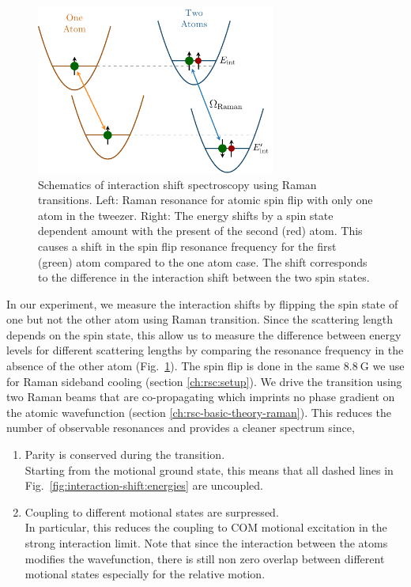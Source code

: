 \begin{figure}
  \centering
  \includegraphics[width=0.7\textwidth]{figures/interaction_shift_measure.pdf}
  \caption[Schematics of interaction shift spectroscopy.]{
    Schematics of interaction shift spectroscopy using Raman transitions.
    Left: Raman resonance for atomic spin flip with only one atom in the tweezer.
    Right: The energy shifts by a spin state dependent amount with the present of
    the second (red) atom. This causes a shift in the spin flip resonance frequency
    for the first (green) atom compared to the one atom case.
    The shift corresponds to the difference in the interaction shift between the
    two spin states.
    \label{fig:interaction-shift:measure}}
\end{figure}

In our experiment, we measure the interaction shifts by flipping the spin state of
one but not the other atom using Raman transition.
Since the scattering length depends on the spin state,
this allow us to measure the difference between energy levels for different scattering lengths
by comparing the resonance frequency in the absence of the other atom
(Fig.~\ref{fig:interaction-shift:measure}).
The spin flip is done in the same $8.8~\mathrm{G}$ we use for Raman sideband cooling
(section \ref{ch:rsc:setup}).
We drive the transition using two Raman beams that are co-propagating
which imprints no phase gradient on the atomic wavefunction
(section \ref{ch:rsc-basic-theory-raman}).
This reduces the number of observable resonances and provides a cleaner spectrum since,
\begin{enumerate}
\item Parity is conserved during the transition.\\
  Starting from the motional ground state, this means that all dashed lines in
  Fig.~\ref{fig:interaction-shift:energies} are uncoupled.
\item Coupling to different motional states are surpressed.\\
  In particular, this reduces the coupling to COM motional excitation
  in the strong interaction limit.
  Note that since the interaction between the atoms modifies the wavefunction,
  there is still non zero overlap between different motional states
  especially for the relative motion.
\end{enumerate}

